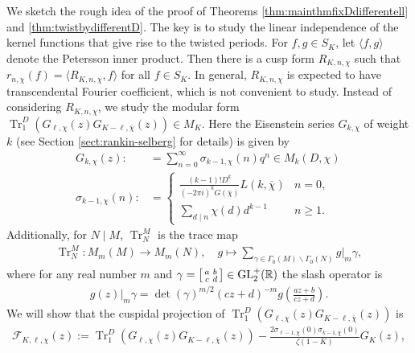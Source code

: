 \documentclass[11pt,letterpaper,reqno]{amsart}
\numberwithin{figure}{section}
\numberwithin{table}{section}
\theoremstyle{definition}
\theoremstyle{plain}
\theoremstyle{definition}
\theoremstyle{definition}
\theoremstyle{remark}
\numberwithin{equation}{section}
\theoremstyle{remark}
\DeclareMathOperator{\Gl}{GL}
\DeclareMathOperator{\Tr}{Tr}
\begin{document}
We sketch the rough idea of the proof of Theorems \ref{thm:mainthmfixDdifferentell} and \ref{thm:twistbydifferentD}. The key is to  study the linear independence of the kernel functions  that give rise to the twisted periods. For $f,g\in S_K$, let $\langle f,g\rangle$ denote the Petersson inner product. Then there is a cusp form $R_{K,n,\chi}$ such that $r_{n,\chi}(f)=\langle R_{K,n,\chi},f\rangle$ for all $f\in S_K$. In general, $R_{K,n,\chi}$ is expected to have transcendental Fourier coefficient, which is not convenient to study. Instead of considering $R_{K,n,\chi}$, we study the modular form $\Tr_1^D(G_{\ell,\chi}(z)G_{K-\ell,\overline{\chi}}(z))\in M_K$. Here the Eisenstein series $G_{k,\chi}$ of weight $k$ (see Section \ref{sect:rankin-selberg} for details) is given by 
\begin{align}
    G_{k,\chi}(z):&=\sum_{n=0}^{\infty}\sigma_{k-1,\chi}(n)q^n\in M_{k}\left(D,\chi\right) \label{eq:Fourier-expan-G}\\
    \sigma_{k-1,\chi}(n):&=\begin{cases}
        \frac{(k-1)!D^k}{(-2\pi i)^kG(\overline{\chi})}L(k,\overline{\chi}) &n=0,\\
         \sum\limits_{d\mid n}\chi(d)d^{k-1}& n\geq1.
    \end{cases}\quad\label{eq:twistsumdivisor}
\end{align}
Additionally, for $N\mid M$, $\Tr_N^M$  is the trace map 
\begin{align} \label{eq:tracemap}
    \Tr_N^M: M_{m}(M)\rightarrow M_m(N),\quad g\mapsto \sum_{\gamma\in\Gamma_0(M)\backslash\Gamma_0(N)}g|_m\gamma,
\end{align}
where for any real number $m$ and $\gamma=\begin{bsmallmatrix}
    a&b\\c&d
\end{bsmallmatrix}\in \Gl_2^+(\mathbb{R})$  the slash operator \cite[Theorem 7.1]{Cohen'smodularformC_k} is
\begin{align} \label{eq:slashoperator}
g(z)|_m\gamma=\det(\gamma)^{m/2} (cz+d)^{-m} g\left(\frac{az+b}{cz+d}\right).
\end{align}
We will show that the cuspidal projection of $\Tr_1^D(G_{\ell,\chi}(z)G_{K-\ell,\overline{\chi}}(z))$ is \begin{align}
    \mathcal{F}_{K,\ell,\chi}(z):=\Tr_1^D(G_{\ell,\chi}(z)G_{K-\ell,\overline{\chi}}(z))-\frac{2\sigma_{\ell-1,\chi}(0)\sigma_{k-1,\overline{\chi}}(0)}{\zeta(1-K)}G_K(z),
\label{eq:F-def}\end{align}
\end{document}
